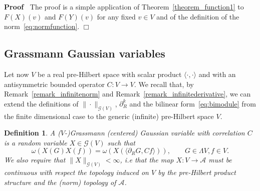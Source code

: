 \documentclass[11pt]{article}
\newenvironment{proof}{\noindent\textbf{Proof\ }}{\hspace*{\fill}$\Box$\medskip}
\newtheorem{definition}{Definition}
\begin{document}
\begin{proof}
  The proof is a simple application of Theorem~\ref{theorem_function1} to $F
  (X) (v)$ and $F (Y) (v)$ for any fixed $v \in V$ and of the definition of
  the norm~{\eqref{eq:normfunction}}.
\end{proof}

\subsection{Grassmann Gaussian variables}\label{sec:gaussians}

Let now $V$ be a real pre-Hilbert space with scalar product $\langle \cdot,
\cdot \rangle$ and with an antisymmetric bounded operator $C : V \rightarrow
V$. We recall that, by Remark~\ref{remark_infinitenorm} and
Remark~\ref{remark_infinitederivative}, we can extend the definitions of $\|
\cdot \|_{\mathcal{G} (V)}$, $\partial_R^k$ and the bilinear
form~{\eqref{eq:bimodule}} from the finite dimensional case to the generic
(infinite) pre-Hilbert space $V$.

\begin{definition}
  A ($V$-)Grassmann (centered) Gaussian variable with correlation $C$ is a
  random variable $X \in \mathcal{G} (V)$ such that
  \begin{equation}
    \omega (X (G) X (f)) = \omega (X (\langle \partial_R G, C f \rangle)),
    \qquad G \in \Lambda V, f \in V. \label{eq:ibp-r}
  \end{equation}
  We also require that $\| X \|_{\mathcal{G} (V)} < \infty$, i.e that the map
  $X : V \rightarrow \mathcal{A}$ must be continuous with respect the topology
  induced on $V$ by the pre-Hilbert product structure and the (norm) topology
  of $\mathcal{A}$.
\end{definition}
\end{document}
